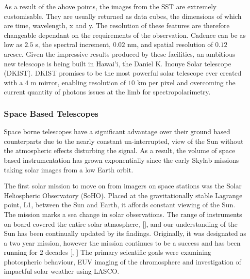 As a result of the above points, the images from the SST are extremely customisable.
They are usually returned as data cubes, the dimensions of which are time, wavelength, x and y.
The resolution of these features are therefore changeable dependant on the requirements of the observation.
Cadence can be as low as $2.5$ s, the spectral increment, $0.02$ nm, and spatial resolution of $0.12$ arcsec.
Given the impressive results produced by these facilities, an ambitious new telescope is being built in Hawai'i, the Daniel K. Inouye Solar telescope (DKIST).
DKIST promises to be the most powerful solar telescope ever created with a $4$ m mirror, enabling resolution of $10$ km per pixel and overcoming the current quantity of photons issues at the limb for spectropolarimetry.



\subsubsection{Space Based Telescopes}

Space borne telescopes have a significant advantage over their ground based counterparts due to the nearly constant un-interrupted, view of the Sun without the atmospheric effects disturbing the signal.
As a result, the volume of space based instrumentation has grown exponentially since the early Skylab missions taking solar images from a low Earth orbit.

The first solar mission to move on from imagers on space stations was the Solar Heliospheric Observatory (SoHO).
Placed at the gravitationally stable Lagrange point, L1, between the Sun and Earth, it affords constant viewing of the Sun.
The mission marks a sea change in solar observations.
The range of instruments on board covered the entire solar atmosphere, [\cite{StCyr1995}], and our understanding of the Sun has been continually updated by its findings.
Originally, it was designated as a two year mission, however the mission continues to be a success and has been running for $2$ decades [\cite{Fleck2006}, \cite{Fleck2016}]
The primary scientific goals were examining photospheric behaviour, EUV imaging of the chromosphere and investigation of impactful solar weather using LASCO.



